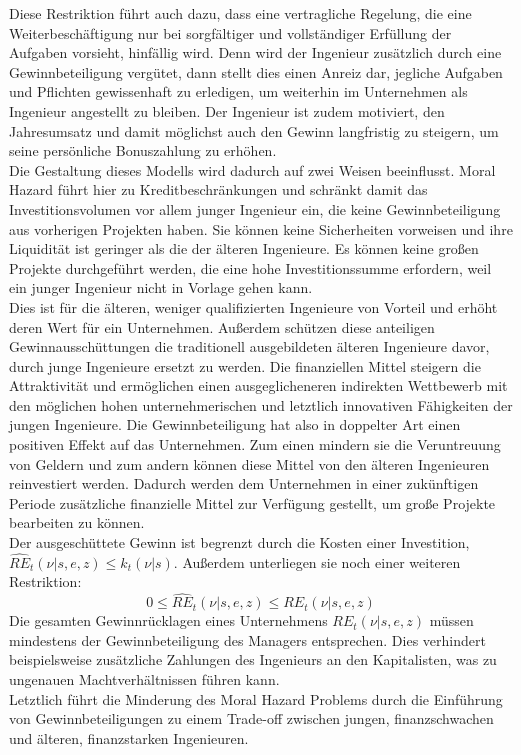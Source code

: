 %
Diese Restriktion führt auch dazu, dass eine vertragliche Regelung, die eine Weiterbeschäftigung nur bei sorgfältiger und vollständiger Erfüllung der Aufgaben vorsieht, hinfällig wird. Denn wird der Ingenieur zusätzlich durch eine Gewinnbeteiligung vergütet, dann stellt dies einen Anreiz dar, jegliche Aufgaben und Pflichten gewissenhaft zu erledigen, um weiterhin im Unternehmen als Ingenieur angestellt zu bleiben. Der Ingenieur ist zudem motiviert, den Jahresumsatz und damit möglichst auch den Gewinn langfristig zu steigern, um seine persönliche Bonuszahlung zu erhöhen.\\
%
Die Gestaltung dieses Modells wird dadurch auf zwei Weisen beeinflusst. Moral Hazard führt hier zu Kreditbeschränkungen und schränkt damit das Investitionsvolumen vor allem junger Ingenieur ein, die keine Gewinnbeteiligung aus vorherigen Projekten haben. Sie können keine Sicherheiten vorweisen und ihre Liquidität ist geringer als die der älteren Ingenieure. Es können keine großen Projekte durchgeführt werden, die eine hohe Investitionssumme erfordern, weil ein junger Ingenieur nicht in Vorlage gehen kann.\\
Dies ist für die älteren, weniger qualifizierten Ingenieure von Vorteil und erhöht deren Wert für ein Unternehmen. Außerdem schützen diese anteiligen Gewinnausschüttungen die traditionell ausgebildeten älteren Ingenieure davor, durch junge Ingenieure ersetzt zu werden. Die finanziellen Mittel steigern die Attraktivität und ermöglichen einen ausgeglicheneren indirekten Wettbewerb mit den möglichen hohen unternehmerischen und letztlich innovativen Fähigkeiten der jungen Ingenieure. Die Gewinnbeteiligung hat also in doppelter Art einen positiven Effekt auf das Unternehmen. Zum einen mindern sie die Veruntreuung von Geldern und zum andern können diese Mittel von den älteren Ingenieuren reinvestiert werden. Dadurch werden dem Unternehmen in einer zukünftigen Periode zusätzliche finanzielle Mittel zur Verfügung gestellt, um große Projekte bearbeiten zu können. \\
%
Der ausgeschüttete Gewinn ist begrenzt durch die Kosten einer Investition, $\widehat{RE}_t(\nu|s,e,z)\leq k_t(\nu|s)$. Außerdem unterliegen sie noch einer weiteren Restriktion:
%
	\begin{equation}
		0\leq\widehat{RE}_t(\nu|s,e,z)\leq RE_t(\nu|s,e,z)
	\end{equation}
%
Die gesamten Gewinnrücklagen eines Unternehmens $RE_t(\nu|s,e,z)$ müssen mindestens der Gewinnbeteiligung des Managers entsprechen. Dies verhindert beispielsweise zusätzliche Zahlungen des Ingenieurs an den Kapitalisten, was zu ungenauen Machtverhältnissen führen kann. \\
%
Letztlich führt die Minderung des Moral Hazard Problems durch die Einführung von Gewinnbeteiligungen zu einem Trade-off zwischen jungen, finanzschwachen und älteren, finanzstarken Ingenieuren. 
%
